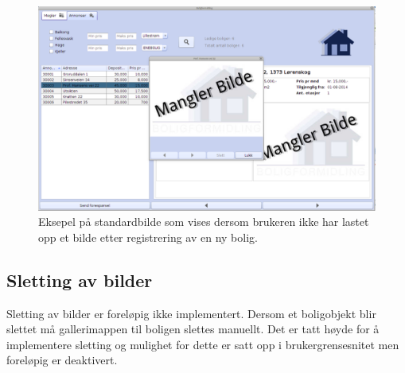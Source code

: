 \begin{figure}[ht!]
 \includegraphics[width=\textwidth,height=\textheight,keepaspectratio]{./img/produktdokumentasjon/bilder/4.png}
 \caption{Eksepel på standardbilde som vises dersom brukeren ikke har lastet opp et bilde etter registrering av en ny bolig.}
 \label{fig:manglerbilde}
\end{figure}

\subsection{Sletting av bilder}
Sletting av bilder er foreløpig ikke implementert. Dersom et boligobjekt blir slettet må gallerimappen til boligen slettes manuellt. Det er tatt høyde for å implementere sletting og mulighet for dette er satt opp i brukergrensesnitet men foreløpig er deaktivert. 